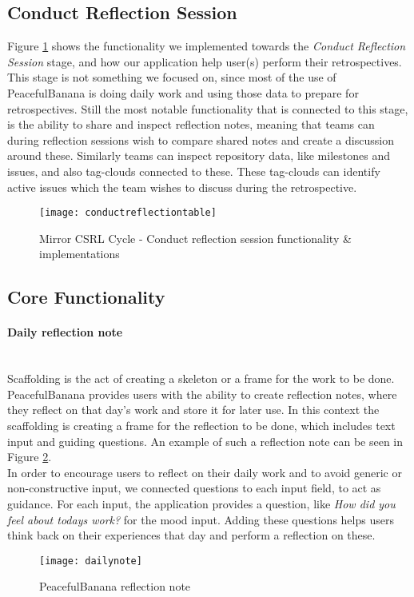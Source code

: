 \subsection{Conduct Reflection Session}
Figure \ref{conductreflectiontable} shows the functionality we implemented towards the \emph{Conduct Reflection Session} stage, and how our application help user(s) perform their retrospectives. 
This stage is not something we focused on, since most of the use of PeacefulBanana is doing daily work and using those data to prepare for retrospectives. Still the most notable functionality that is connected to this stage, is the ability to share and inspect reflection notes, meaning that teams can during reflection sessions wish to compare shared notes and create a discussion around these. Similarly teams can inspect repository data, like milestones and issues, and also tag-clouds connected to these. These tag-clouds can identify active issues which the team wishes to discuss during the retrospective. 
\begin{figure}[H]
\centering
    \texttt{[image: conductreflectiontable]}
\caption{Mirror CSRL Cycle - Conduct reflection session functionality \& implementations}
\label{conductreflectiontable}
\end{figure}

\subsection{Core Functionality}
\paragraph{Daily reflection note}\mbox{}\\
Scaffolding is the act of creating a skeleton or a frame for the work to be done.
PeacefulBanana provides users with the ability to create reflection notes, where they reflect on that day's work and store it for later use. In this context the scaffolding is creating a frame for the reflection to be done, which includes text input and guiding questions. An example of such a reflection note can be seen in Figure \ref{dailynotefunc}. \\
In order to encourage users to reflect on their daily work and to avoid generic or non-constructive input, we connected questions to each input field, to act as guidance. For each input, the application provides a question, like \emph{How did you feel about todays work?} for the mood input. Adding these questions helps users think back on their experiences that day and perform a reflection on these. 
\begin{figure}[H]
    \centering
        \texttt{[image: dailynote]}
    \caption{PeacefulBanana reflection note}
    \label{dailynotefunc}
\end{figure}

